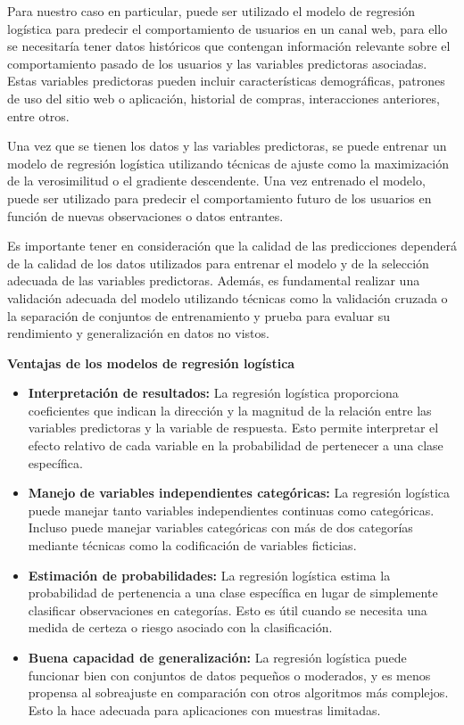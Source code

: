 Para nuestro caso en particular, puede ser utilizado el modelo de regresión logística para predecir el comportamiento de usuarios en un canal web, para ello se necesitaría tener datos históricos que contengan información relevante sobre el comportamiento pasado de los usuarios y las variables predictoras asociadas. Estas variables predictoras pueden incluir características demográficas, patrones de uso del sitio web o aplicación, historial de compras, interacciones anteriores, entre otros.

Una vez que se tienen los datos y las variables predictoras, se puede entrenar un modelo de regresión logística utilizando técnicas de ajuste como la maximización de la verosimilitud o el gradiente descendente. Una vez entrenado el modelo, puede ser utilizado para predecir el comportamiento futuro de los usuarios en función de nuevas observaciones o datos entrantes.

Es importante tener en consideración que la calidad de las predicciones dependerá de la calidad de los datos utilizados para entrenar el modelo y de la selección adecuada de las variables predictoras. Además, es fundamental realizar una validación adecuada del modelo utilizando técnicas como la validación cruzada o la separación de conjuntos de entrenamiento y prueba para evaluar su rendimiento y generalización en datos no vistos.

\textbf{Ventajas de los modelos de regresión logística}

\begin{itemize}
    \item \textbf{Interpretación de resultados:} La regresión logística proporciona coeficientes que indican la dirección y la magnitud de la relación entre las variables predictoras y la variable de respuesta. Esto permite interpretar el efecto relativo de cada variable en la probabilidad de pertenecer a una clase específica.
    \item \textbf{Manejo de variables independientes categóricas:} La regresión logística puede manejar tanto variables independientes continuas como categóricas. Incluso puede manejar variables categóricas con más de dos categorías mediante técnicas como la codificación de variables ficticias.
    \item \textbf{Estimación de probabilidades:} La regresión logística estima la probabilidad de pertenencia a una clase específica en lugar de simplemente clasificar observaciones en categorías. Esto es útil cuando se necesita una medida de certeza o riesgo asociado con la clasificación.
    \item \textbf{Buena capacidad de generalización:} La regresión logística puede funcionar bien con conjuntos de datos pequeños o moderados, y es menos propensa al sobreajuste en comparación con otros algoritmos más complejos. Esto la hace adecuada para aplicaciones con muestras limitadas.    
\end{itemize}

